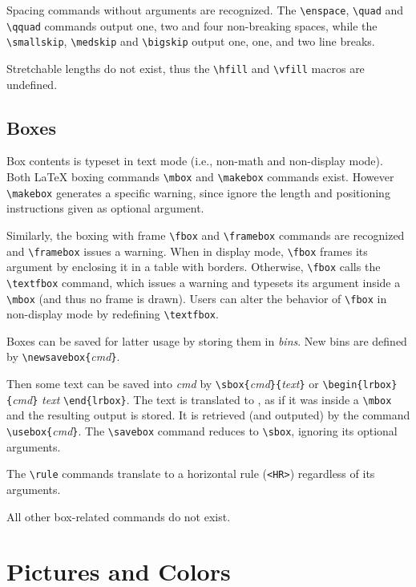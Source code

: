 Spacing commands without arguments are recognized.
The \verb+\enspace+, \verb+\quad+ and \verb+\qquad+ commands output
one, two and four non-breaking spaces, while the \verb+\smallskip+,
\verb+\medskip+ and \verb+\bigskip+ output one, one, and two line
breaks.

Stretchable lengths do not exist, thus the \verb+\hfill+ and
\verb+\vfill+ macros are undefined.

\subsection{Boxes}

Box contents is typeset in text mode (i.e., non-math and non-display
mode).
Both \LaTeX{} boxing commands \verb+\mbox+ and \verb+\makebox+
commands exist.
However  \verb+\makebox+ generates a specific warning, since \hevea{}
ignore the length and positioning instructions given as optional
argument.

Similarly, the boxing with frame \verb+\fbox+ and \verb+\framebox+
commands are recognized and
\verb+\framebox+ issues a warning.
When in display mode, \verb+\fbox+ frames its argument by
enclosing it in a
table with borders. Otherwise, \verb+\fbox+ calls the \verb+\textfbox+
command, which issues a warning and typesets its argument
inside a \verb+\mbox+ (and thus no frame is drawn).
Users can alter the behavior of \verb+\fbox+ in non-display mode by
redefining \verb+\textfbox+.



Boxes can be saved for latter usage by storing them in {\em bins}.
New bins are defined by \verb+\newsavebox{+{\it cmd}\verb+}+.

Then some text can be saved into {\it cmd} by
\verb+\sbox{+{\it cmd}\verb+}{+{\it text}\verb+}+ or
\verb+\begin{lrbox}{+\textit{cmd}\verb+}+ \textit{text} \verb+\end{lrbox}+.
The text is translated to \html{}, as if it was inside a \verb+\mbox+
and the resulting output is stored.
It is retrieved (and outputed) by the command
\verb+\usebox{+{\it cmd}\verb+}+.
The \verb+\savebox+ command reduces to \verb+\sbox+, ignoring its
optional arguments.

The \verb+\rule+ commands translate to a \html{} horizontal rule
(\verb+<HR>+)  regardless of its arguments.


All other box-related commands do not exist.

\section{Pictures and Colors}

